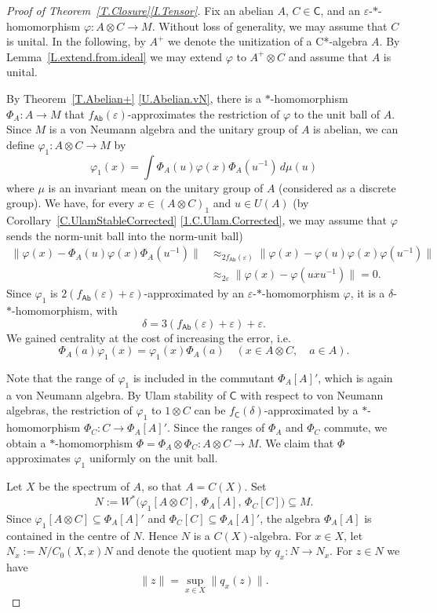 \documentclass[10pt,a4paper]{amsart}
\newcommand{\cstar}{C*}
\newcommand{\sfC}{\mathsf C}
\DeclareMathOperator{\sfCOM}{\mathsf {Ab}}
\begin{document}
\begin{proof}[Proof of Theorem~\ref{T.Closure}\eqref{I.Tensor}] 
	Fix an abelian $A$, $C\in \sfC$, and an $\varepsilon$-$*$-homomorphism $\varphi\colon A\otimes  C\to M$. Without loss of generality, we may assume that $C$ is unital.
	In the following, by  $A^+$ we denote the unitization of a \cstar-algebra $A$.  
	By Lemma~\ref{L.extend.from.ideal} we may extend $\varphi$ to $A^+\otimes C$ and assume that $A$ is unital. 
	
	By Theorem~\ref{T.Abelian+} \eqref{U.Abelian.vN}, there is a $*$-homomorphism $\Phi_A\colon A\to M$ that $f_{\sfCOM}(\varepsilon)$-approximates the restriction of $\varphi$ to the unit ball of $A$. Since $M$ is a von Neumann algebra and the unitary group of $A$ is abelian, we can define $\varphi_1\colon A\otimes C\to M$ by  
	\[
	\varphi_1(x)=\int \Phi_A(u)\varphi(x)\Phi_A(u^{-1})\, d\mu(u)
	\]
	where $\mu$ is an invariant mean on the unitary group of $A$ (considered as a discrete group). We have, for every $x\in (A\otimes C)_1$ and $u\in U(A)$ (by Corollary~\ref{C.UlamStableCorrected}   \eqref{1.C.Ulam.Corrected}, 
	 we may assume that $\varphi$ sends the norm-unit ball into the norm-unit ball)
	\begin{align*}
		\|\varphi(x)-\Phi_A(u)\varphi(x)\Phi_A(u^{-1})\|
		&\approx_{2f_{\sfCOM}(\varepsilon)} 
		\|\varphi(x)-\varphi(u)\varphi(x)\varphi(u^{-1})\|\\
		&\approx_{2\varepsilon}
		\|\varphi(x)-\varphi(uxu^{-1})\|=0. 
	\end{align*}
	Since $\varphi_1$ is $2(f_{\sfCOM}(\varepsilon)+\varepsilon)$-approximated by an $\varepsilon$-$*$-homomorphism $\varphi$, it is a $\delta$-$*$-homomorphism, with 
	\[
	\delta=3(f_{\sfCOM}(\varepsilon)+\varepsilon)+\varepsilon. 
	\]
	We gained centrality at the cost of increasing the error, i.e.
	$$\Phi_A(a)\varphi_1(x) = \varphi_1(x)\Phi_A(a) \quad (x \in A \otimes C, \quad a \in A).$$
	
	Note that the range of $\varphi_1$ is included in the commutant
	$\Phi_A[A]'$, which is again a von Neumann algebra.
	By Ulam stability of $\sfC$ with respect to von Neumann algebras,
	the restriction of $\varphi_1$ to $1\otimes C$ can be
	$f_{\sfC}(\delta)$-approximated by a $*$-homomorphism
	$
		\Phi_C\colon C\to \Phi_A[A]'.
	$
	Since the ranges of $\Phi_A$ and $\Phi_C$ commute, we obtain a
	$*$-homomorphism
	$
		\Phi=\Phi_A\otimes \Phi_C\colon A\otimes C\to M.
	$
	We claim that $\Phi$ approximates $\varphi_1$ uniformly on the unit ball.

	Let $X$ be the spectrum of $A$, so that $A=C(X)$.
	Set
	\[
		N:=W^*\bigl(\varphi_1[A\otimes C],\,\Phi_A[A],\,\Phi_C[C]\bigr)
		\subseteq M.
	\]
	Since $\varphi_1[A\otimes C]\subseteq \Phi_A[A]'$ and
	$\Phi_C[C]\subseteq \Phi_A[A]'$, the algebra $\Phi_A[A]$ is contained
	in the centre of $N$. Hence $N$ is a $C(X)$-algebra. For $x\in X$, let
	$
		N_x:=N/C_0(X,x)N
	$
	and denote the quotient map by $q_x\colon N\to N_x$.
	For $z\in N$ we have
	\[
		\|z\|=\sup_{x\in X}\|q_x(z)\|.
	\]


\end{proof}
\end{document}
